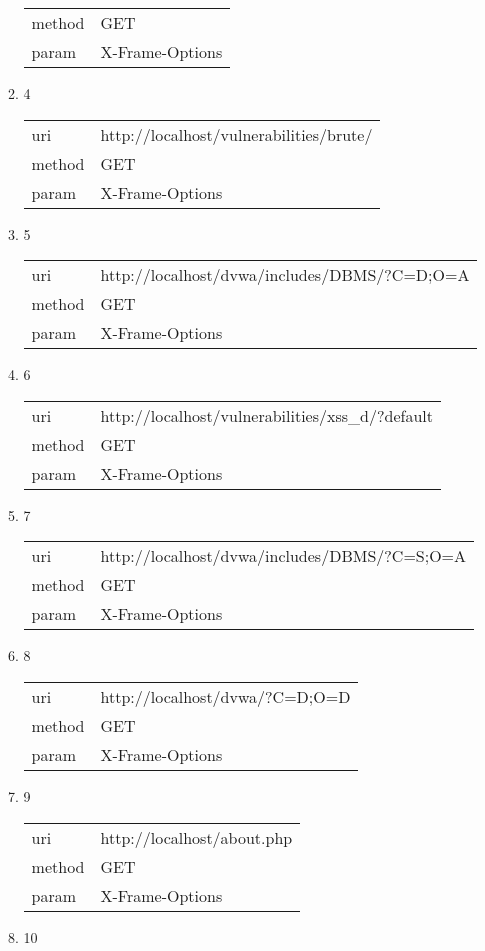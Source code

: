 \documentclass[10pt]{article}
\begin{document}
\begin{itemize}
\begin{enumerate}
\begin{tabular}{| l | p{12cm}}
method & GET \\
param & X-Frame-Options \\
\end{tabular}
\item[] 4
\begin{tabular}{| l | p{12cm}}
uri & http://localhost/vulnerabilities/brute/ \\
method & GET \\
param & X-Frame-Options \\
\end{tabular}
\item[] 5
\begin{tabular}{| l | p{12cm}}
uri & http://localhost/dvwa/includes/DBMS/?C=D;O=A \\
method & GET \\
param & X-Frame-Options \\
\end{tabular}
\item[] 6
\begin{tabular}{| l | p{12cm}}
uri & http://localhost/vulnerabilities/xss\_d/?default \\
method & GET \\
param & X-Frame-Options \\
\end{tabular}
\item[] 7
\begin{tabular}{| l | p{12cm}}
uri & http://localhost/dvwa/includes/DBMS/?C=S;O=A \\
method & GET \\
param & X-Frame-Options \\
\end{tabular}
\item[] 8
\begin{tabular}{| l | p{12cm}}
uri & http://localhost/dvwa/?C=D;O=D \\
method & GET \\
param & X-Frame-Options \\
\end{tabular}
\item[] 9
\begin{tabular}{| l | p{12cm}}
uri & http://localhost/about.php \\
method & GET \\
param & X-Frame-Options \\
\end{tabular}
\item[] 10
\begin{tabular}{| l | p{12cm}}

\end{tabular}
\end{enumerate}
\end{itemize}
\end{document}
